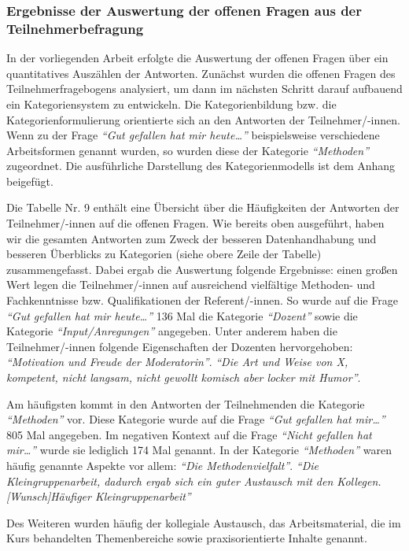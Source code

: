 \documentclass[12pt,a4paper]{article}
\begin{document}
\subsubsection{Ergebnisse der Auswertung der offenen Fragen aus der Teilnehmerbefragung}

In der vorliegenden Arbeit erfolgte die Auswertung der offenen Fragen über ein quantitatives Auszählen der Antworten. Zunächst wurden die offenen Fragen des Teilnehmerfragebogens analysiert, um dann im nächsten Schritt darauf aufbauend ein Kategoriensystem zu entwickeln. Die Kategorienbildung bzw. die Kategorienformulierung orientierte sich an den Antworten der Teilnehmer/-innen. Wenn zu der Frage\textit{ "`Gut gefallen hat mir heute…"'} beispielsweise verschiedene Arbeitsformen  genannt wurden, so wurden diese der Kategorie \textit{"`Methoden"'} zugeordnet. Die ausführliche Darstellung des Kategorienmodells ist dem Anhang beigefügt.

Die Tabelle Nr. 9 enthält eine Übersicht über die Häufigkeiten der Antworten der Teilnehmer/-innen auf die offenen Fragen. Wie bereits oben ausgeführt, haben wir die gesamten Antworten zum Zweck der besseren Datenhandhabung und besseren Ü\-ber\-blicks zu Kategorien (siehe obere Zeile der Tabelle) zusammengefasst. Dabei ergab die Auswertung folgende Ergebnisse: einen großen Wert legen die Teil\-neh\-mer/-in\-nen auf ausreichend vielfältige Methoden- und Fachkenntnisse bzw. Qualifikationen der Referent/-innen. So wurde auf die Frage\textit{ "`Gut gefallen hat mir heute…"'} 136 Mal die Kategorie \textit{"`Dozent"'} sowie die Kategorie \textit{"`Input/Anregungen"'} angegeben. Unter anderem haben die Teilnehmer/-innen folgende Eigenschaften der Dozenten hervorgehoben: 
\textit{"`Motivation und Freude der Moderatorin"'}.
\textit{"`Die Art und Weise von X, kompetent, nicht langsam, nicht gewollt komisch aber locker mit Humor"'}.

	Am häufigsten kommt in den Antworten der Teilnehmenden die Kategorie \textit{"`Methoden"'} vor. Diese Kategorie wurde auf die Frage \textit{"`Gut gefallen hat mir…"'} 805 Mal angegeben. Im negativen Kontext auf die Frage \textit{"`Nicht gefallen hat mir…"'} wurde sie lediglich 174 Mal genannt. In der Kategorie \textit{"`Methoden"'} waren häufig genannte Aspekte vor allem: 
\textit{ "`Die Methodenvielfalt"'}.
\textit{"`Die Kleingruppenarbeit, dadurch ergab sich ein guter Austausch mit den Kollegen. [Wunsch]Häufiger Kleingruppenarbeit"'}

Des Weiteren wurden häufig der kollegiale Austausch, das Arbeitsmaterial, die im Kurs behandelten Themenbereiche sowie praxisorientierte Inhalte genannt.
\end{document}
